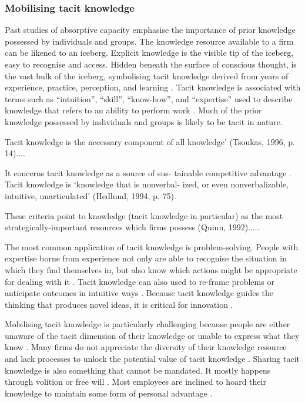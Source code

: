 \subsubsection{Mobilising tacit knowledge}

Past studies of absorptive capacity emphasise the importance of prior knowledge possessed by individuals and groups. The knowledge resource available to a firm can be likened to an iceberg. Explicit knowledge is the visible tip of the iceberg, easy to recognise and access. Hidden beneath the surface of conscious thought, is the vast bulk of the iceberg, symbolising tacit knowledge derived from years of experience, practice, perception, and learning \citep{spender1996making,haldin2000difficulties,mcadam2007exploring,rebernik2007fostering}. Tacit knowledge is associated with terms such as \enquote{intuition}, \enquote{skill}, \enquote{know-how}, and \enquote{expertise} used to describe knowledge that refers to an ability to perform work \citep{horvath2000working,mcadam2007exploring}. Much of the prior knowledge possessed by individuals and groups is likely to be tacit in nature. \medskip

Tacit knowledge is the necessary component of all knowledge’ (Tsoukas, 1996, p. 14)....

It concerns tacit knowledge as a source of sus- tainable competitive advantage \citep{schultze2004knowing}. Tacit knowledge is ‘knowledge that is nonverbal- ized, or even nonverbalizable, intuitive, unarticulated’ (Hedlund, 1994, p. 75).

These criteria point to knowledge (tacit knowledge in particular) as the most strategically-important resources which firms possess (Quinn, 1992).....

The most common application of tacit knowledge is problem-solving. People with expertise borne from experience not only are able to recognise the situation in which they find themselves in, but also know which actions might be appropriate for dealing with it \citep{simon1971human,leonard1998role}. Tacit knowledge can also used to re-frame problems or anticipate outcomes in intuitive ways \citep{leonard1998role}. Because tacit knowledge guides the thinking that produces novel ideas, it is critical for innovation \citep{leonard1998role,amar2008descriptive}. \medskip

Mobilising tacit knowledge is particularly challenging because people are either unaware of the tacit dimension of their knowledge or unable to express what they know \citep{polanyi1966tacit,leonard1998role}. Many firms do not appreciate the diversity of their knowledge resource and lack processes to unlock the potential value of tacit knowledge \citep{nonaka1994dynamic,horvath2000working}. Sharing tacit knowledge is also something that cannot be mandated. It mostly happens through volition or free will \citep{polanyi1966tacit}. Most employees are inclined to hoard their knowledge to maintain some form of personal advantage \citep{eraut2000non,riege2005three,milne2007motivation}.  \medskip

